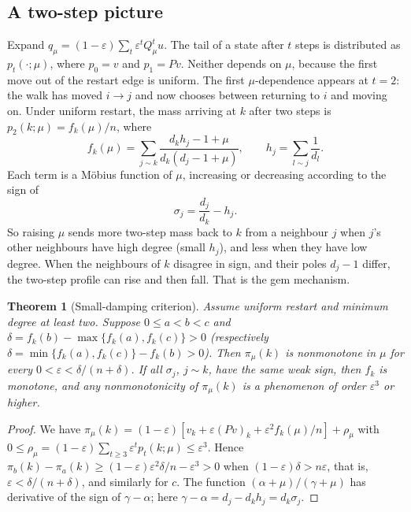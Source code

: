 \documentclass[11pt,a4paper]{article}
\newtheorem{theorem}{Theorem}[section]
\theoremstyle{definition}\newtheorem{conjecture}{Conjecture}
\theoremstyle{remark}\newtheorem{remark}[theorem]{Remark}
\newcommand{\eps}{\varepsilon}
\begin{document}
\subsection{A two-step picture}
Expand $q_\mu=(1-\eps)\sum_t\eps^tQ_\mu^tu$. The tail of a state after $t$ steps is distributed as $p_t(\cdot;\mu)$, where $p_0=v$ and $p_1=Pv$. Neither depends on $\mu$, because the first move out of the restart edge is uniform. The first $\mu$-dependence appears at $t=2$: the walk has moved $i\to j$ and now chooses between returning to $i$ and moving on. Under uniform restart, the mass arriving at $k$ after two steps is $p_2(k;\mu)=f_k(\mu)/n$, where
\begin{equation}\label{eq:twostep}
 f_k(\mu)=\sum_{j\sim k}\frac{d_kh_j-1+\mu}{d_k(d_j-1+\mu)},
 \qquad h_j=\sum_{l\sim j}\frac1{d_l}.
\end{equation}
Each term is a M\"obius function of $\mu$, increasing or decreasing according to the sign of
\[
 \sigma_j=\frac{d_j}{d_k}-h_j.
\]
So raising $\mu$ sends more two-step mass back to $k$ from a neighbour $j$ when $j$'s other neighbours have high degree (small $h_j$), and less when they have low degree. When the neighbours of $k$ disagree in sign, and their poles $d_j-1$ differ, the two-step profile can rise and then fall. That is the gem mechanism.

\begin{theorem}[Small-damping criterion]\label{thm:twostep}
Assume uniform restart and minimum degree at least two. Suppose $0\leq a<b<c$ and $\delta=f_k(b)-\max\{f_k(a),f_k(c)\}>0$ (respectively $\delta=\min\{f_k(a),f_k(c)\}-f_k(b)>0$). Then $\pi_\mu(k)$ is nonmonotone in $\mu$ for every $0<\eps<\delta/(n+\delta)$. If all $\sigma_j$, $j\sim k$, have the same weak sign, then $f_k$ is monotone, and any nonmonotonicity of $\pi_\mu(k)$ is a phenomenon of order $\eps^3$ or higher.
\end{theorem}
\begin{proof}
We have $\pi_\mu(k)=(1-\eps)[v_k+\eps(Pv)_k+\eps^2f_k(\mu)/n]+\rho_\mu$ with $0\leq\rho_\mu=(1-\eps)\sum_{t\geq3}\eps^tp_t(k;\mu)\leq\eps^3$. Hence $\pi_b(k)-\pi_a(k)\geq(1-\eps)\eps^2\delta/n-\eps^3>0$ when $(1-\eps)\delta>n\eps$, that is, $\eps<\delta/(n+\delta)$, and similarly for $c$. The function $(\alpha+\mu)/(\gamma+\mu)$ has derivative of the sign of $\gamma-\alpha$; here $\gamma-\alpha=d_j-d_kh_j=d_k\sigma_j$.
\end{proof}
\end{document}
